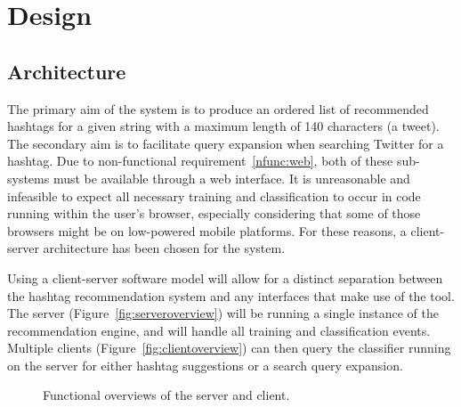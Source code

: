 \documentclass[11pt,a4paper]{report}
\begin{document}
\pagebreak

\chapter{Design}
\label{chap:design}

\section{Architecture}

The primary aim of the system is to produce an ordered list of recommended hashtags for a given string with a maximum length of 140 characters (a tweet). The secondary aim is to facilitate query expansion when searching Twitter for a hashtag. Due to non-functional requirement~\ref{nfunc:web}, both of these sub-systems must be available through a web interface. It is unreasonable and infeasible to expect all necessary training and classification to occur in code running within the user's browser, especially considering that some of those browsers might be on low-powered mobile platforms. For these reasons, a client-server architecture has been chosen for the system.

Using a client-server software model will allow for a distinct separation between the hashtag recommendation system and any interfaces that make use of the tool. The server (Figure~\ref{fig:serveroverview}) will be running a single instance of the recommendation engine, and will handle all training and classification events. Multiple clients (Figure~\ref{fig:clientoverview}) can then query the classifier running on the server for either hashtag suggestions or a search query expansion.

\begin{figure}[htpb]
    \centering
    \caption{Functional overviews of the server and client.}
\end{figure}
\end{document}
